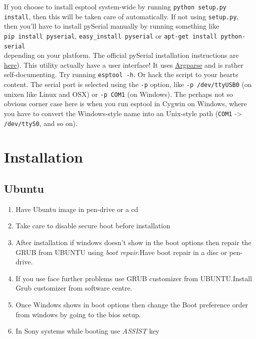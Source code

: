 \documentclass[16pt]{article}
\begin{document}
If you choose to install esptool system-wide by running
\texttt{python setup.py install}, then this will be taken care of
automatically.
If not using \texttt{setup.py}, then you'll have to install pySerial
manually by running something like \\

\texttt{pip install pyserial},
\texttt{easy\_install pyserial} or
\texttt{apt-get install python-serial} \\
\vspace{0.3cm}
depending on your platform. The
official pySerial installation instructions are
{\color{red}\href{http://pyserial.sourceforge.net/pyserial.html\#installation}{here}}).
This utility actually have a user interface! It uses
{\color{red}\href{https://docs.python.org/dev/library/argparse.html}{Argparse}}
and is rather self-documenting. Try running \texttt{esptool -h}. Or hack the
script to your hearts content. The serial port is selected using the
\texttt{-p} option, like \texttt{-p /dev/ttyUSB0} (on unixen like Linux
and OSX) or \texttt{-p COM1} (on Windows). The perhaps not so obvious
corner case here is when you run esptool in Cygwin on Windows, where you
have to convert the Windows-style name into an Unix-style path
(\texttt{COM1} -\textgreater{} \texttt{/dev/ttyS0}, and so on).

\vspace{9cm}

\section{Installation}
 
\vspace{1cm}                                    %


 
\subsection{Ubuntu}

\hfill
  \begin{enumerate}
  \item
    Have Ubuntu image in pen-drive or a cd
  \item
    Take care to disable secure boot before installation
  \item
    After installation if windows doesn't show in the boot options then
    repair the GRUB from UBUNTU using \emph{boot repair}.Have boot repair in a disc or pen-drive.
  \item
    If you use face further problems use GRUB customizer from UBUNTU.Install Grub customizer from software centre.
  \item
    Once Windows shows in boot options then change the Boot preference
    order from windows by going to the bios setup.
  \item
    In Sony systems while booting use \emph{ASSIST} key
  \end{enumerate}
  
\end{document}
